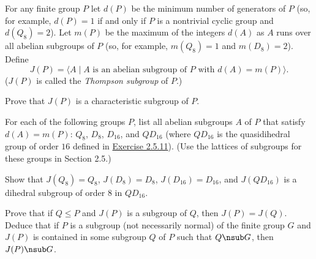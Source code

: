 \begin{specialexercise}
	For any finite group $P$ let $d(P)$ be the minimum number of generators of $P$ (so, for example, $d(P)=1$ if and only if $P$ is a nontrivial cyclic group and $d(Q_8)=2$). Let $m(P)$ be the maximum of the integers $d(A)$ as $A$ runs over all abelian subgroups of $P$ (so, for example, $m(Q_8)=1$ and $m(D_8)=2$). Define
	\[J(P)=\langle A \mid A \text{ is an abelian subgroup of } P \text{ with } d(A)=m(P)\rangle.\]
	($J(P)$ is called the \emph{Thompson subgroup} of $P$.)
	\begin{subproblems}
		\item Prove that $J(P)$ is a characteristic subgroup of $P$.
		\item For each of the following groups $P$, list all abelian subgroups $A$ of $P$ that satisfy $d(A)=m(P)$: $Q_8$, $D_8$, $D_{16}$, and $QD_{16}$ (where $QD_{16}$ is the quasidihedral group of order $16$ defined in \hyperref[ex2.5.11]{Exercise 2.5.11}). (Use the lattices of subgroups for these groups in Section 2.5.)
		\item Show that $J(Q_8)=Q_8$, $J(D_8)=D_8$, $J(D_{16})=D_{16}$, and $J(QD_{16})$ is a dihedral subgroup of order $8$ in $QD_{16}$.
		\item Prove that if $Q\le P$ and $J(P)$ is a subgroup of $Q$, then $J(P)=J(Q)$. Deduce that if $P$ is a subgroup (not necessarily normal) of the finite group $G$ and $J(P)$ is contained in some subgroup $Q$ of $P$ such that $Q \nsub G$, then $J(P) \nsub G$.
	\end{subproblems}
\end{specialexercise}

